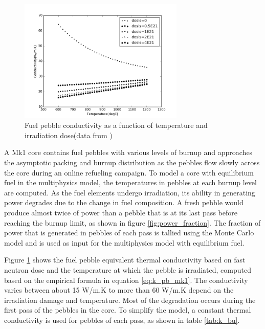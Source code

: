 \documentclass{elsarticle}
\begin{document}
 \begin{figure}[h]
  \centering
  \includegraphics[width=0.7\textwidth]{./images/design/fuel_conductivity.png}
  \caption{Fuel pebble conductivity as a function of temperature and irradiation dose(data from \cite{IAEA2000})}
  \label{fig:fuel_conductivity_mk1}
\end{figure}

A Mk1 core contains fuel pebbles with various levels of burnup and approaches the asymptotic packing and burnup distribution as the pebbles flow slowly across the core during an online refueling campaign. To model a core with equilibrium fuel in the multiphysics model, the temperatures in pebbles at each burnup level are computed. As the fuel elements undergo irradiation, its ability in generating power degrades due to the change in fuel composition. 
A fresh pebble would produce almost twice of power than a pebble that is at its last pass before reaching the burnup limit, as shown in figure \ref{fig:power_fraction}. The fraction of power that is generated in pebbles of each pass is tallied using the Monte Carlo model and is used as input for the multiphysics model with equilibrium fuel. 

Figure \ref{fig:fuel_conductivity_mk1} shows the fuel pebble equivalent thermal conductivity based on fast neutron dose and the temperature at which the pebble is irradiated, computed based on the empirical formula in equation \ref{eq:k_pb_mk1}.
The conductivity varies between about 15 W/m.K to more than 60 W/m.K depend on the irradiation damage and temperature. Most of the degradation occurs during the first pass of the pebbles in the core. To simplify the model, a constant thermal conductivity is used for pebbles of each pass, as shown in table \ref{tab:k_bu}.


 
\end{document}

